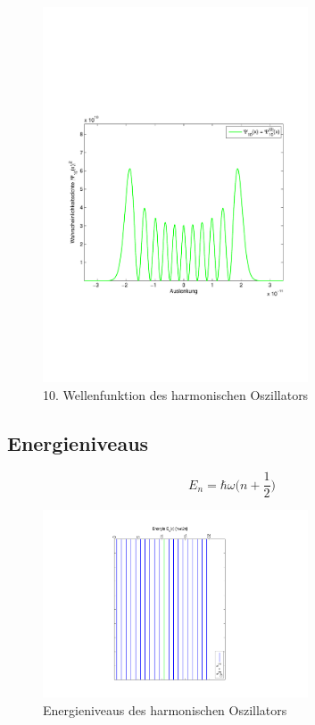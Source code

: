 \begin{refsection}
\begin{figure}[h]	%
\centering
\includegraphics[width=0.7\textwidth]{anharmonisch/images/Wellenfunktion.pdf}
\caption{10. Wellenfunktion des harmonischen Oszillators
\label{skript:Wellenfunktion}}
\end{figure}

\subsection{Energieniveaus}
\[
E_n
=
\hbar\omega\biggl(n+\frac12\biggr)
\]

\begin{figure}[h]	%
\centering
\includegraphics[width=0.7\textwidth]{anharmonisch/images/Energie.pdf}
\caption{Energieniveaus des harmonischen Oszillators
\label{skript:Energie}}
\end{figure}


\end{refsection}
